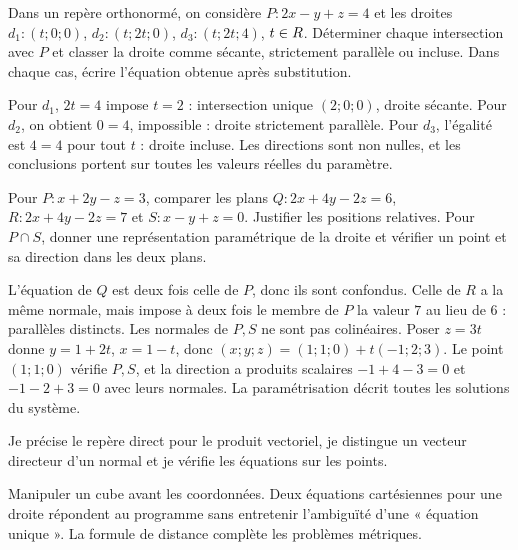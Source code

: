 \label{t11s-c17-p01}
Dans un repère orthonormé, on considère $P:2x-y+z=4$ et les droites $d_1:(t;0;0)$, $d_2:(t;2t;0)$, $d_3:(t;2t;4)$, $t\in R$. Déterminer chaque intersection avec $P$ et classer la droite comme sécante, strictement parallèle ou incluse. Dans chaque cas, écrire l’équation obtenue après substitution.
\begin{corrige}\label{sol-t11s-c17-p01}
Pour $d_1$, $2t=4$ impose $t=2$ : intersection unique $(2;0;0)$, droite sécante. Pour $d_2$, on obtient $0=4$, impossible : droite strictement parallèle. Pour $d_3$, l’égalité est $4=4$ pour tout $t$ : droite incluse. Les directions sont non nulles, et les conclusions portent sur toutes les valeurs réelles du paramètre.
\end{corrige}
\label{t11s-c17-p02}
Pour $P:x+2y-z=3$, comparer les plans $Q:2x+4y-2z=6$, $R:2x+4y-2z=7$ et $S:x-y+z=0$. Justifier les positions relatives. Pour $P\cap S$, donner une représentation paramétrique de la droite et vérifier un point et sa direction dans les deux plans.
\begin{corrige}\label{sol-t11s-c17-p02}
L’équation de $Q$ est deux fois celle de $P$, donc ils sont confondus. Celle de $R$ a la même normale, mais impose à deux fois le membre de $P$ la valeur $7$ au lieu de $6$ : parallèles distincts. Les normales de $P,S$ ne sont pas colinéaires. Poser $z=3t$ donne $y=1+2t$, $x=1-t$, donc $(x;y;z)=(1;1;0)+t(-1;2;3)$. Le point $(1;1;0)$ vérifie $P,S$, et la direction a produits scalaires $-1+4-3=0$ et $-1-2+3=0$ avec leurs normales. La paramétrisation décrit toutes les solutions du système.
\end{corrige}

\begin{jemeteste}Je précise le repère direct pour le produit vectoriel, je distingue un vecteur directeur d’un normal et je vérifie les équations sur les points.\end{jemeteste}
\begin{notepourlaclasse}Manipuler un cube avant les coordonnées. Deux équations cartésiennes pour une droite répondent au programme sans entretenir l’ambiguïté d’une « équation unique ». La formule de distance complète les problèmes métriques.\end{notepourlaclasse}
